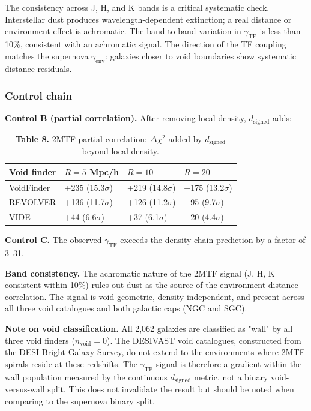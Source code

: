 \documentclass[11pt,a4paper]{article}
\begin{document}
The consistency across J, H, and K bands is a critical systematic check. Interstellar dust produces wavelength-dependent extinction; a real distance or environment effect is achromatic. The band-to-band variation in \(\gamma_\mathrm{TF}\) is less than 10\%, consistent with an achromatic signal. The direction of the TF coupling matches the supernova \(\gamma_\mathrm{env}\): galaxies closer to void boundaries show systematic distance residuals.

\subsubsection{Control chain}
\textbf{Control B (partial correlation).} After removing local density, \(d_\mathrm{signed}\) adds:

\begin{table}[H]
\centering
\footnotesize
\caption{\textbf{Table 8.} 2MTF partial correlation: \(\Delta\chi^2\) added by \(d_\mathrm{signed}\) beyond local density.}
\begin{tabularx}{\linewidth}{l>{\RaggedRight\arraybackslash}X>{\RaggedRight\arraybackslash}X>{\RaggedRight\arraybackslash}X}
\toprule
\textbf{Void finder} & \textbf{\(R = 5\) Mpc/\allowbreak{}h} & \textbf{\(R = 10\)} & \textbf{\(R = 20\)} \tabularnewline
\midrule
VoidFinder & +235 (15.3\(\sigma\)) & +219 (14.8\(\sigma\)) & +175 (13.2\(\sigma\)) \tabularnewline
REVOLVER & +136 (11.7\(\sigma\)) & +126 (11.2\(\sigma\)) & +95 (9.7\(\sigma\)) \tabularnewline
VIDE & +44 (6.6\(\sigma\)) & +37 (6.1\(\sigma\)) & +20 (4.4\(\sigma\)) \tabularnewline
\bottomrule
\end{tabularx}
\end{table}

\textbf{Control C.} The observed \(\gamma_\mathrm{TF}\) exceeds the density chain prediction by a factor of 3--31.

\begin{mdframed}[linecolor=accent,linewidth=0.5pt,backgroundcolor=callout-bg,leftline=true,rightline=true,topline=true,bottomline=true,innerleftmargin=8pt,innerrightmargin=8pt,innertopmargin=6pt,innerbottommargin=6pt]
\textbf{Band consistency.} The achromatic nature of the 2MTF signal (J, H, K consistent within 10\%) rules out dust as the source of the environment-distance correlation. The signal is void-geometric, density-independent, and present across all three void catalogues and both galactic caps (NGC and SGC).
\end{mdframed}

\textbf{Note on void classification.} All 2,062 galaxies are classified as "wall" by all three void finders (\(n_\mathrm{void} = 0\)). The DESIVAST void catalogues, constructed from the DESI Bright Galaxy Survey, do not extend to the environments where 2MTF spirals reside at these redshifts. The \(\gamma_\mathrm{TF}\) signal is therefore a gradient within the wall population measured by the continuous \(d_\mathrm{signed}\) metric, not a binary void-versus-wall split. This does not invalidate the result but should be noted when comparing to the supernova binary split.
\end{document}
